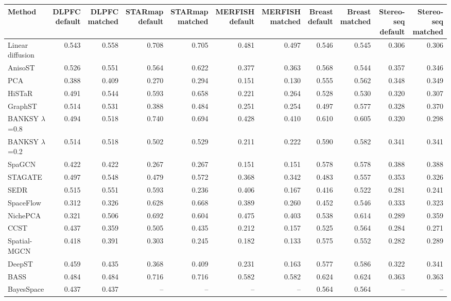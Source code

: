 \footnotesize
\begin{tabular}{lrrrrrrrrrr}
\toprule
Method & \shortstack{DLPFC\\default} & \shortstack{DLPFC\\matched} & \shortstack{STARmap\\default} & \shortstack{STARmap\\matched} & \shortstack{MERFISH\\default} & \shortstack{MERFISH\\matched} & \shortstack{Breast\\default} & \shortstack{Breast\\matched} & \shortstack{Stereo-seq\\default} & \shortstack{Stereo-seq\\matched} \\
\midrule
Linear diffusion & 0.543 & 0.558 & 0.708 & 0.705 & 0.481 & 0.497 & 0.546 & 0.545 & 0.306 & 0.306 \\
AnisoST & 0.526 & 0.551 & 0.564 & 0.622 & 0.377 & 0.363 & 0.568 & 0.544 & 0.357 & 0.346 \\
PCA & 0.388 & 0.409 & 0.270 & 0.294 & 0.151 & 0.130 & 0.555 & 0.562 & 0.348 & 0.349 \\
HiSTaR & 0.491 & 0.544 & 0.593 & 0.658 & 0.221 & 0.264 & 0.528 & 0.530 & 0.320 & 0.307 \\
GraphST & 0.514 & 0.531 & 0.388 & 0.484 & 0.251 & 0.254 & 0.497 & 0.577 & 0.328 & 0.370 \\
BANKSY $\lambda$=0.8 & 0.494 & 0.518 & 0.740 & 0.694 & 0.428 & 0.410 & 0.610 & 0.605 & 0.320 & 0.298 \\
BANKSY $\lambda$=0.2 & 0.514 & 0.518 & 0.502 & 0.529 & 0.211 & 0.222 & 0.590 & 0.582 & 0.341 & 0.341 \\
SpaGCN & 0.422 & 0.422 & 0.267 & 0.267 & 0.151 & 0.151 & 0.578 & 0.578 & 0.388 & 0.388 \\
STAGATE & 0.497 & 0.548 & 0.479 & 0.572 & 0.368 & 0.342 & 0.483 & 0.557 & 0.353 & 0.326 \\
SEDR & 0.515 & 0.551 & 0.593 & 0.236 & 0.406 & 0.167 & 0.416 & 0.522 & 0.281 & 0.241 \\
SpaceFlow & 0.312 & 0.326 & 0.628 & 0.668 & 0.389 & 0.260 & 0.452 & 0.546 & 0.333 & 0.323 \\
NichePCA & 0.321 & 0.506 & 0.692 & 0.604 & 0.475 & 0.403 & 0.538 & 0.614 & 0.289 & 0.359 \\
CCST & 0.437 & 0.359 & 0.505 & 0.435 & 0.212 & 0.157 & 0.525 & 0.564 & 0.284 & 0.271 \\
Spatial-MGCN & 0.418 & 0.391 & 0.303 & 0.245 & 0.182 & 0.133 & 0.575 & 0.552 & 0.282 & 0.289 \\
DeepST & 0.459 & 0.435 & 0.368 & 0.409 & 0.231 & 0.163 & 0.577 & 0.586 & 0.322 & 0.341 \\
BASS & 0.484 & 0.484 & 0.716 & 0.716 & 0.582 & 0.582 & 0.624 & 0.624 & 0.363 & 0.363 \\
BayesSpace & 0.437 & 0.437 & -- & -- & -- & -- & 0.564 & 0.564 & -- & -- \\
\bottomrule
\end{tabular}
